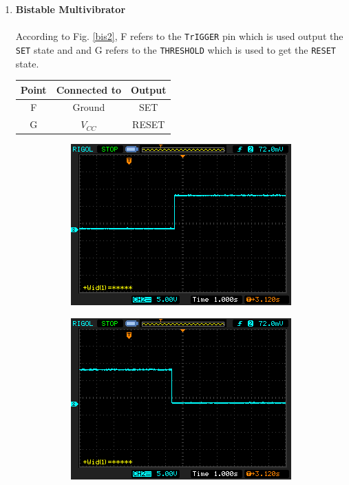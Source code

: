 \begin{enumerate}
\item \textbf{Bistable Multivibrator}\\\\
According to Fig. \ref{bis2}, F refers to the \verb|TrIGGER| pin which is used output the \verb|SET| state and and G refers to the \verb|THRESHOLD| which is used to get the \verb|RESET| state.
\begin{table}[H]
    \centering
    \begin{tabular}{|c|c|c|}\hline
        Point & Connected to & Output \\ \hline
        F & Ground   & SET \\ \hline
        G & $V_{CC}$ & RESET  \\ \hline
    \end{tabular}
\end{table}
\begin{figure}[H]
    \centering
    \begin{subfigure}[b]{0.45\textwidth}
        \centering
        \includegraphics[width=\textwidth]{images/bi2.png}
        \caption{}
    \end{subfigure}
    \hfill
    \begin{subfigure}[b]{0.45\textwidth}
        \centering
        \includegraphics[width=\textwidth]{images/bi4.png}

\end{subfigure}
\end{figure}
\end{enumerate}
